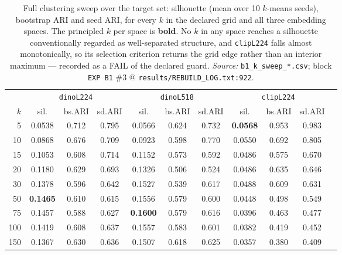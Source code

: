 \begin{table}[h]
\caption{Full clustering sweep over the target set: silhouette (mean over 10 $k$-means seeds),
bootstrap ARI and seed ARI, for every $k$ in the declared grid and all three embedding spaces.
The principled $k$ per space is \textbf{bold}. No $k$ in any space reaches a silhouette conventionally
regarded as well-separated structure, and \texttt{clipL224} falls almost monotonically, so its selection
criterion returns the grid edge rather than an interior maximum --- recorded as a FAIL of the declared
guard. \emph{Source:} \texttt{b1\_k\_sweep\_*.csv};
block \texttt{EXP B1} \#3 @ \texttt{results/REBUILD\_LOG.txt:922}.}
\label{tab:silhouette}
\begin{center}\small
\begin{tabular}{rcccccccccc}
\toprule
& \multicolumn{3}{c}{\texttt{dinoL224}} & \multicolumn{3}{c}{\texttt{dinoL518}} & \multicolumn{3}{c}{\texttt{clipL224}} \\
\cmidrule(lr){2-4}\cmidrule(lr){5-7}\cmidrule(lr){8-10}
$k$ & sil. & bs.ARI & sd.ARI & sil. & bs.ARI & sd.ARI & sil. & bs.ARI & sd.ARI \\
\midrule
5 & 0.0538 & 0.712 & 0.795 & 0.0566 & 0.624 & 0.732 & \textbf{0.0568} & 0.953 & 0.983 \\
10 & 0.0868 & 0.676 & 0.709 & 0.0923 & 0.598 & 0.770 & 0.0550 & 0.692 & 0.805 \\
15 & 0.1053 & 0.608 & 0.714 & 0.1152 & 0.573 & 0.592 & 0.0486 & 0.575 & 0.670 \\
20 & 0.1180 & 0.629 & 0.693 & 0.1326 & 0.506 & 0.524 & 0.0486 & 0.635 & 0.646 \\
30 & 0.1378 & 0.596 & 0.642 & 0.1527 & 0.539 & 0.617 & 0.0488 & 0.609 & 0.631 \\
50 & \textbf{0.1465} & 0.610 & 0.615 & 0.1556 & 0.579 & 0.600 & 0.0448 & 0.498 & 0.549 \\
75 & 0.1457 & 0.588 & 0.627 & \textbf{0.1600} & 0.579 & 0.616 & 0.0396 & 0.463 & 0.477 \\
100 & 0.1419 & 0.608 & 0.637 & 0.1557 & 0.583 & 0.601 & 0.0382 & 0.419 & 0.452 \\
150 & 0.1367 & 0.630 & 0.636 & 0.1507 & 0.618 & 0.625 & 0.0357 & 0.380 & 0.409 \\
\bottomrule
\end{tabular}
\end{center}
\end{table}

